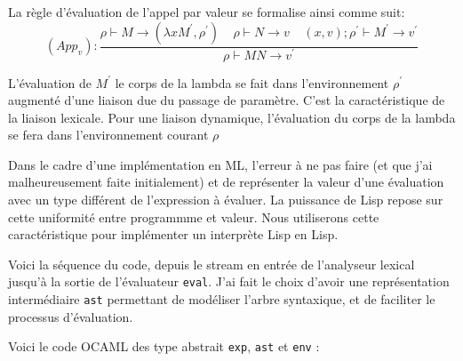 \documentclass[11pt]{book}
\begin{document}
La règle d'évaluation de l'appel par valeur se formalise ainsi comme suit:
\[(App_v): \frac{\rho \vdash M \rightarrow (\lambda x M^{'} , \rho ^{'} )  
		\ \ \ \ \ \rho \vdash N \rightarrow v \ \ \ \ \ (x,v);\rho ^{'} \vdash M^{'} \rightarrow v^{'} }
		 { \rho \vdash M N \rightarrow v^{'} }
\]

L'évaluation de $M^{'}$ le corps de la lambda se fait dans l'environnement $\rho ^{'}$ augmenté 
d'une liaison due du passage de paramètre. C'est la caractéristique de la liaison lexicale.
Pour  une liaison dynamique, l'évaluation du corps de la lambda se fera  dans l'environnement
courant $\rho$

Dans le cadre d'une implémentation en ML, l'erreur à ne pas faire (et que j'ai malheureusement faite initialement) et de
représenter la valeur d'une évaluation avec un type différent de l'expression à évaluer.
La puissance de Lisp repose sur  cette uniformité entre programmme et valeur. Nous utiliserons cette caractéristique pour
implémenter un interprète Lisp en Lisp.

Voici la séquence du code, depuis le stream en entrée de l'analyseur lexical jusqu'à la sortie de l'évaluateur \verb+eval+.
J'ai  fait le choix d'avoir une représentation intermédiaire \verb+ast+ permettant de modéliser l'arbre syntaxique, et de faciliter
le processus d'évaluation.
\begin{center}
\end{center}


Voici le code OCAML des type abstrait \verb+exp+, \verb+ast+ et \verb+env+ :
\end{document}
